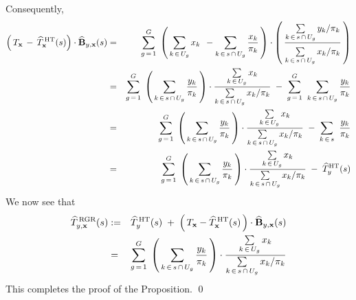 Consequently,
\begin{eqnarray*}
\left(\,T_{\mathbf{x}} \,-\, \widehat{T}^{\,\textnormal{HT}}_{\mathbf{x}}(s)\right)
\cdot
\widehat{\mathbf{B}}_{y,\mathbf{x}}(s)
& = &
	\overset{G}{\underset{g\,=\,1}{\sum}}\;
	\left(\,
		\underset{k\,\in\,U_{g}}{\sum}\, x_{k}
		 \;\, -
		 \underset{k\,\in\,s\,\cap\,U_{g}}{\sum}\, \dfrac{x_{k}}{\pi_{k}}
	\,\right)
	\cdot
	\left(\,
		\dfrac{
			\underset{k\,\in\,s\,\cap\,U_{g}}{\sum}\, y_{k} / \pi_{k}
		}{
			\overset{{\color{white}.}}{\underset{k\,\in\,s\,\cap\,U_{g}}{\sum}\, x_{k}/\pi_{k}}
		}
	\,\right)
\\
& = &
	\overset{G}{\underset{g\,=\,1}{\sum}}\;
	\left(\,
		\underset{k\,\in\,s\,\cap\,U_{g}}{\sum}\, \dfrac{y_{k}}{\pi_{k}}
	\,\right)
	\cdot
	\dfrac{
		\underset{k\,\in\,U_{g}}{\sum}\, x_{k}
	}{
		\underset{k\,\in\,s\,\cap\,U_{g}}{\sum}\, x_{k}/\pi_{k}
	}
	\; - \;
	\overset{G}{\underset{g\,=\,1}{\sum}}\;\;
	\underset{k\,\in\,s\,\cap\,U_{g}}{\sum}\, \dfrac{y_{k}}{\pi_{k}}
\\
& = &
	\overset{G}{\underset{g\,=\,1}{\sum}}\;
	\left(\,
		\underset{k\,\in\,s\,\cap\,U_{g}}{\sum}\, \dfrac{y_{k}}{\pi_{k}}
	\,\right)
	\cdot
	\dfrac{
		\underset{k\,\in\,U_{g}}{\sum}\, x_{k}
	}{
		\underset{k\,\in\,s\,\cap\,U_{g}}{\sum}\, x_{k}/\pi_{k}
	}
	\; - \;
	\underset{k\,\in\,s}{\sum}\;\;\dfrac{y_{k}}{\pi_{k}}
\\
& = &
	\overset{G}{\underset{g\,=\,1}{\sum}}\;
	\left(\,
		\underset{k\,\in\,s\,\cap\,U_{g}}{\sum}\, \dfrac{y_{k}}{\pi_{k}}
	\,\right)
	\cdot
	\dfrac{
		\underset{k\,\in\,U_{g}}{\sum}\, x_{k}
	}{
		\underset{k\,\in\,s\,\cap\,U_{g}}{\sum}\, x_{k}/\pi_{k}
	}
	\; - \;
	\widehat{T}^{\textnormal{HT}}_{y}(s)
\end{eqnarray*}
We now see that
\begin{eqnarray*}
\widehat{T}^{\,\textnormal{RGR}}_{y,\mathbf{x}}(s)
& := &
	\widehat{T}^{\,\textnormal{HT}}_{y}(s)
	\; + \;
	\left(\,T_{\mathbf{x}} - \widehat{T}^{\,\textnormal{HT}}_{\mathbf{x}}(s) \,\right)
	\cdot
	\widehat{\mathbf{B}}_{y,\mathbf{x}}(s)
\\
& = &
	\overset{G}{\underset{g\,=\,1}{\sum}}\;
	\left(\,
		\underset{k\,\in\,s\,\cap\,U_{g}}{\sum}\, \dfrac{y_{k}}{\pi_{k}}
	\,\right)
	\cdot
	\dfrac{
		\underset{k\,\in\,U_{g}}{\sum}\, x_{k}
	}{
		\underset{k\,\in\,s\,\cap\,U_{g}}{\sum}\, x_{k}/\pi_{k}
	}
\end{eqnarray*}
This completes the proof of the Proposition.
\qed


\renewcommand{\theenumi}{\roman{enumi}}
\renewcommand{\labelenumi}{\textnormal{(\theenumi)}$\;\;$}

